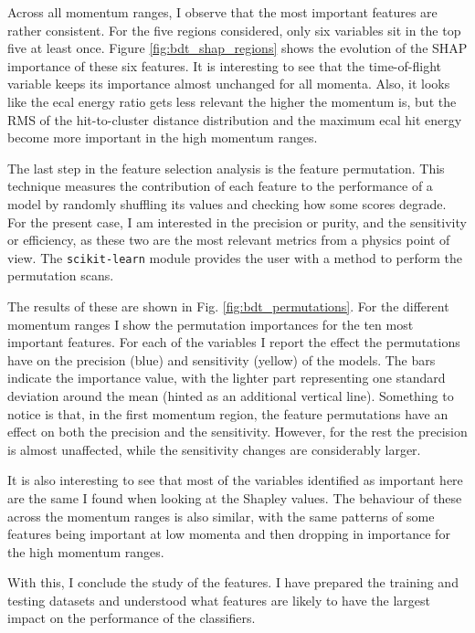Across all momentum ranges, I observe that the most important features are rather consistent. For the five regions considered, only six variables sit in the top five at least once. Figure \ref{fig:bdt_shap_regions} shows the evolution of the SHAP importance of these six features. It is interesting to see that the time-of-flight variable keeps its importance almost unchanged for all momenta. Also, it looks like the \gls{ecal} energy ratio gets less relevant the higher the momentum is, but the RMS of the hit-to-cluster distance distribution and the maximum \gls{ecal} hit energy become more important in the high momentum ranges.

The last step in the feature selection analysis is the feature permutation. This technique measures the contribution of each feature to the performance of a model by randomly shuffling its values and checking how some scores degrade. For the present case, I am interested in the precision or purity, and the sensitivity or efficiency, as these two are the most relevant metrics from a physics point of view. The \texttt{scikit-learn} module provides the user with a method to perform the permutation scans.

The results of these are shown in Fig. \ref{fig:bdt_permutations}. For the different momentum ranges I show the permutation importances for the ten most important features. For each of the variables I report the effect the permutations have on the precision (blue) and sensitivity (yellow) of the models. The bars indicate the importance value, with the lighter part representing one standard deviation around the mean (hinted as an additional vertical line). Something to notice is that, in the first momentum region, the feature permutations have an effect on both the precision and the sensitivity. However, for the rest the precision is almost unaffected, while the sensitivity changes are considerably larger.

It is also interesting to see that most of the variables identified as important here are the same I found when looking at the Shapley values. The behaviour of these across the momentum ranges is also similar, with the same patterns of some features being important at low momenta and then dropping in importance for the high momentum ranges.

With this, I conclude the study of the features. I have prepared the training and testing datasets and understood what features are likely to have the largest impact on the performance of the classifiers.


